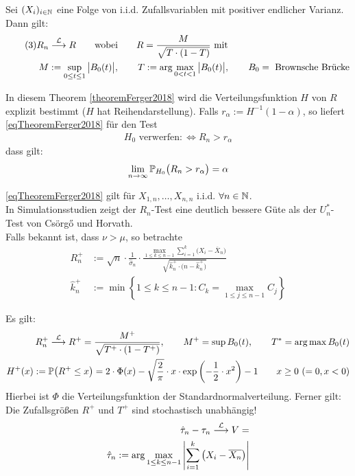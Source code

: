 \begin{thm}\label{theoremFerger2018} %
	Sei $(X_i)_{i\in\mathbb{N}}$ eine Folge von i.i.d. Zufallsvariablen mit positiver endlicher Varianz. Dann gilt:
	\begin{align}\label{eqTheoremFerger2018}\tag{3}
		R_n&\stackrel{\mathcal{L}}{\longrightarrow} R
		\qquad\text{wobei}\qquad
		R=\frac{M}{\sqrt{T\cdot(1-T)}}\text{ mit }\\
		M&:=\sup\limits_{0\leq t\leq 1}\big|B_0(t)\big|\nonumber,\qquad
		T:=\arg\max\limits_{0<t<1}\big|B_0(t)\big|,\qquad
		B_0=\text{ Brownsche Brücke}\nonumber
	\end{align}
\end{thm}

In diesem Theorem \ref{theoremFerger2018} wird die Verteilungsfunktion $H$ von $R$ explizit bestimmt ($H$ hat Reihendarstellung).
Falls $r_\alpha:=H^{-1}(1-\alpha)$, so liefert \eqref{eqTheoremFerger2018} für den Test
\begin{align*}
	H_0\text{ verwerfen}:\Longleftrightarrow R_n>r_\alpha
\end{align*}
dass gilt:
\begin{align*}
	\lim\limits_{n\to\infty}\mathbb{P}_{H_0}\big(R_n>r_\alpha\big)=\alpha
\end{align*}

\begin{bemerkung}
	\eqref{eqTheoremFerger2018} gilt für $X_{1,n},\ldots,X_{n,n}$ i.i.d. $\forall n\in\mathbb{N}$.\\
	In Simulationsstudien zeigt der $R_n$-Test eine deutlich bessere Güte als der $U_n^\ast$-Test von Csörgő und Horvath.\\
	Falls bekannt ist, dass $\nu>\mu$, so betrachte
	\begin{align*}
		R_n^+&:=\sqrt{n}\cdot\frac{1}{\hat{\sigma}_n}\cdot\frac{\max\limits_{1\leq k\leq n-1}\sum\limits_{i=1}^k\big(X_i-\overline{X}_n\big)}{\sqrt{\hat{k}_n^+\cdot\big(n-\hat{k}_n^+\big)}}\\
		\hat{k}_n^+&:=\min\left\lbrace 1\leq k\leq n-1:C_k=\max\limits_{1\leq j\leq n-1}C_j\right\rbrace
	\end{align*}
\end{bemerkung}

Es gilt:
\begin{align*}
	R_n^+\stackrel{\mathcal{L}}{\longrightarrow} R^+=\frac{M^+}{\sqrt{T^+\cdot(1-T^+)}},\qquad
	M^+=\sup\limits B_0(t),\qquad
	T^*=\arg\max\limits B_0(t)\\
	H^+(x):=\mathbb{P}\big(R^+\leq x\big)=2\cdot\Phi(x)-\sqrt{\frac{2}{\pi}}\cdot x\cdot\exp\left(-\frac{1}{2}\cdot x^2\right)-1\qquad x\geq0~(=0, x<0)
\end{align*}
Hierbei ist $\Phi$ die Verteilungsfunktion der Standardnormalverteilung. Ferner gilt:\\
Die Zufallsgrößen $R^+$ und $T^+$ sind stochastisch unabhängig!
\begin{align*}
	\hat{\tau}_n-\tau_n\stackrel{\mathcal{L}}{\longrightarrow}V=\\
	\hat{\tau}_n:=\arg\max\limits_{1\leq k\leq n-1}\left|\sum\limits_{i=1}^k\big(X_i-\overline{X_n}\big)\right|
\end{align*}

